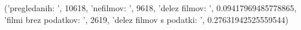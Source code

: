 ('pregledanih: ', 10618, 'nefilmov: ', 9618, 'delez filmov: ', 0.09417969485778865, 'filmi brez podatkov: ', 2619, 'delez filmov s podatki: ', 0.27631942525559544)